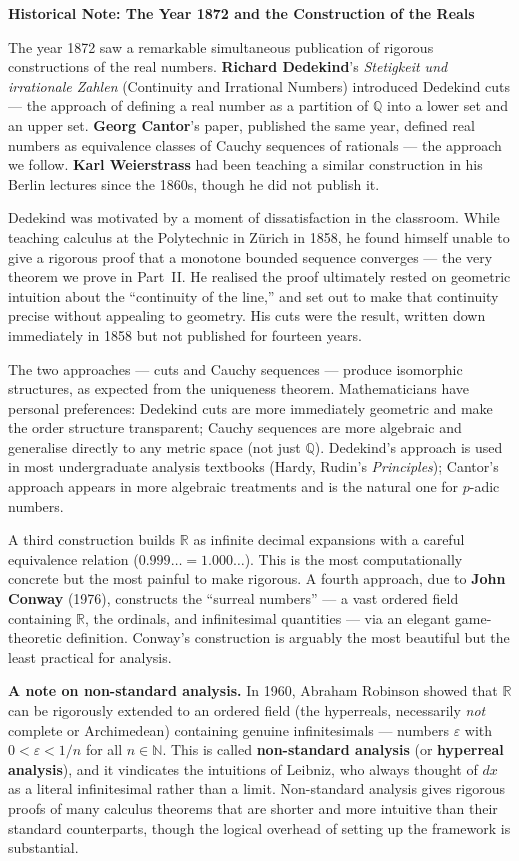 \documentclass[12pt, openany]{book}
\theoremstyle{plain}
\theoremstyle{definition}
\theoremstyle{remark}
\newcommand{\N}{\mathbb{N}}
\newcommand{\Q}{\mathbb{Q}}
\newcommand{\R}{\mathbb{R}}
\newcommand{\eps}{\varepsilon}
\begin{document}
\begin{remarkbox}
\textbf{Historical Note: The Year 1872 and the Construction of the Reals}

The year 1872 saw a remarkable simultaneous publication of rigorous constructions of the real numbers. \textbf{Richard Dedekind}'s \emph{Stetigkeit und irrationale Zahlen} (Continuity and Irrational Numbers) introduced Dedekind cuts --- the approach of defining a real number as a partition of $\Q$ into a lower set and an upper set. \textbf{Georg Cantor}'s paper, published the same year, defined real numbers as equivalence classes of Cauchy sequences of rationals --- the approach we follow. \textbf{Karl Weierstrass} had been teaching a similar construction in his Berlin lectures since the 1860s, though he did not publish it.

Dedekind was motivated by a moment of dissatisfaction in the classroom. While teaching calculus at the Polytechnic in Z\"{u}rich in 1858, he found himself unable to give a rigorous proof that a monotone bounded sequence converges --- the very theorem we prove in Part~II. He realised the proof ultimately rested on geometric intuition about the ``continuity of the line,'' and set out to make that continuity precise without appealing to geometry. His cuts were the result, written down immediately in 1858 but not published for fourteen years.

The two approaches --- cuts and Cauchy sequences --- produce isomorphic structures, as expected from the uniqueness theorem. Mathematicians have personal preferences: Dedekind cuts are more immediately geometric and make the order structure transparent; Cauchy sequences are more algebraic and generalise directly to any metric space (not just $\Q$). Dedekind's approach is used in most undergraduate analysis textbooks (Hardy, Rudin's \emph{Principles}); Cantor's approach appears in more algebraic treatments and is the natural one for $p$-adic numbers.

A third construction builds $\R$ as infinite decimal expansions with a careful equivalence relation ($0.999\ldots = 1.000\ldots$). This is the most computationally concrete but the most painful to make rigorous. A fourth approach, due to \textbf{John Conway} (1976), constructs the ``surreal numbers'' --- a vast ordered field containing $\R$, the ordinals, and infinitesimal quantities --- via an elegant game-theoretic definition. Conway's construction is arguably the most beautiful but the least practical for analysis.

\textbf{A note on non-standard analysis.} In 1960, Abraham Robinson showed that $\R$ can be rigorously extended to an ordered field (the hyperreals, necessarily \emph{not} complete or Archimedean) containing genuine infinitesimals --- numbers $\eps$ with $0 < \eps < 1/n$ for all $n \in \N$. This is called \textbf{non-standard analysis} (or \textbf{hyperreal analysis}), and it vindicates the intuitions of Leibniz, who always thought of $dx$ as a literal infinitesimal rather than a limit. Non-standard analysis gives rigorous proofs of many calculus theorems that are shorter and more intuitive than their standard counterparts, though the logical overhead of setting up the framework is substantial.
\end{remarkbox}
\end{document}
